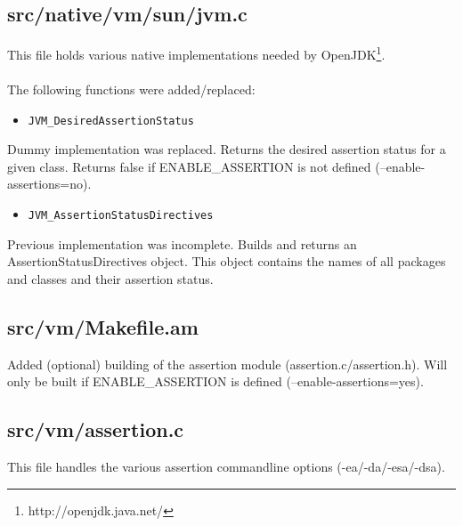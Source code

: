 \documentclass{article}%
\begin{document}
\subsection{src/native/vm/sun/jvm.c}
\label{see5}
This file holds various native implementations needed by OpenJDK\footnote{http://openjdk.java.net/}.
\\\\
The following functions were added/replaced:
\begin{itemize}
\item{\verb'JVM_DesiredAssertionStatus'}
\end{itemize}
\noindent Dummy implementation was replaced. Returns the desired assertion status for a given class. Returns false if ENABLE\_ASSERTION is not defined (--enable-assertions=no).
\begin{itemize}
\item{\verb'JVM_AssertionStatusDirectives'}
\end{itemize}
\noindent Previous implementation was incomplete. Builds and returns an AssertionStatusDirectives object. This object contains the names of all packages and classes and their assertion status.

\subsection{src/vm/Makefile.am}
Added (optional) building of the assertion module (assertion.c/assertion.h). Will only be built if ENABLE\_ASSERTION is defined (--enable-assertions=yes).

\subsection{src/vm/assertion.c}
\label{see3}
This file handles the various assertion commandline options (-ea/-da/-esa/-dsa).
\end{document}
